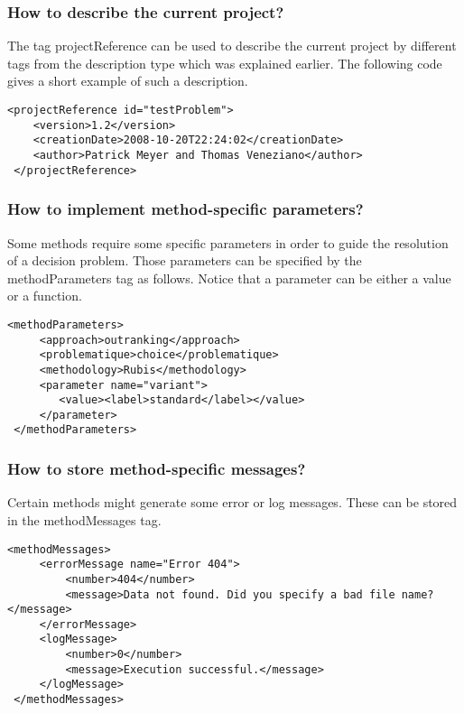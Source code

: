 \documentclass[a4paper,oneside,10 pt]{article}
\newcommand{\code}{\asciifamily}
\begin{document}
\subsubsection{How to describe the current project?}

The tag {\code projectReference} can be used to describe the current project by different tags from the {\code description} type which was explained earlier. The following code gives a short example of such a description. 
{\code
\begin{lstlisting}[style=prototype]
 <projectReference id="testProblem">
	<version>1.2</version>
	<creationDate>2008-10-20T22:24:02</creationDate>
	<author>Patrick Meyer and Thomas Veneziano</author>
 </projectReference>
\end{lstlisting}
}

\subsubsection{How to implement method-specific parameters?}

Some methods require some specific parameters in order to guide the resolution of a decision problem. Those parameters can be specified by the {\code methodParameters} tag as follows. Notice that a parameter can be either a value or a function.

{\code
\begin{lstlisting}[style=prototype]
 <methodParameters>
	 <approach>outranking</approach>
	 <problematique>choice</problematique>
	 <methodology>Rubis</methodology>
	 <parameter name="variant">
	 	<value><label>standard</label></value>
	 </parameter>
 </methodParameters>
\end{lstlisting}
}

\subsubsection{How to store method-specific messages?}

Certain methods might generate some error or log messages. These can be stored in the {\code methodMessages} tag. 

{\code
\begin{lstlisting}[style=prototype]
 <methodMessages>
	 <errorMessage name="Error 404">
		 <number>404</number>
		 <message>Data not found. Did you specify a bad file name?</message>
	 </errorMessage>
	 <logMessage>
		 <number>0</number>
		 <message>Execution successful.</message>
	 </logMessage>
 </methodMessages>
\end{lstlisting}
}
\end{document}
